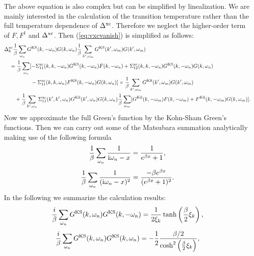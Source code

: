 %
The above equation is also complex but can be simplified by linealization.
We are mainly interested in the calculation of the transition temperature rather than the full temperature 
dependence of $\Delta^{\rm xc}$. Therefore we neglect the higher-order term of $F, F^{\dag}$ and $\Delta^{\rm xc}$.
Then (\ref{eq:vxcvanish}) is simplified as follows:
%
\begin{equation}
	\begin{split}
		&\Delta^{\rm xc}_{k}\frac{1}{\beta}\sum_{\omega_n}G^{\rm KS}(k,-\omega_n)G(k,\omega_n)
		\frac{1}{\beta}\sum_{k',\omega_m}G^{\rm KS}(k',\omega_m)G(k',\omega_m) \\
		& \quad =
		\frac{1}{\beta}\sum_{\omega_n} [-\Sigma^{\rm xc}_{11}(k,k,-\omega_n)G^{\rm KS}(k,-\omega_n)F(k,-\omega_n)
		+\Sigma^{\rm xc}_{12}(k,k,-\omega_n)G^{\rm KS}(k,-\omega_n)G(k,\omega_n) \\
		&\quad \quad \quad \quad \quad - \Sigma^{\rm xc}_{11}(k,k,\omega_n)F^{\rm KS}(k,-\omega_n)G(k,\omega_n)]
		\times \frac{1}{\beta}\sum_{k',\omega_m} G^{\rm KS}(k',\omega_m)G(k', \omega_m) \\
		& \quad \quad +
		\frac{1}{\beta}\sum_{k',\omega_n}\Sigma^{\rm xc}_{11}(k',k',\omega_n)G^{\rm KS}(k',\omega_n)
		G(k,\omega_n)\frac{1}{\beta}\sum_{\omega_m}
		[G^{\rm KS}(k,-\omega_m)F(k,-\omega_m) + F^{\rm KS}(k,-\omega_m)G(k,\omega_m)].
	\end{split}
	\label{eq:Deltaxceq}
\end{equation}
%
Now we approximate the full Green's function by the Kohn-Sham Green's functions.
Then we can carry out some of the Matsubara summation analytically making use of the following formula
%
\begin{equation}
	\frac{1}{\beta} \sum_{\omega_n} \frac{1}{ {\rm i}\omega_n - x} = 
	\frac{1}{e^{\beta x}+1},
	\label{eq:sumform1}
\end{equation}
%
\begin{equation}
	\frac{1}{\beta} \sum_{\omega_n} \frac{1}{ ({\rm i}\omega_n - x)^2} = 
	\frac{-\beta e^{\beta x}}{(e^{\beta x}+1)^2}.
	\label{eq:sumform2}
\end{equation}
%
In the following we summarize the calculation results: 
%
\begin{equation}
	\frac{i}{\beta}\sum_{\omega_n}
	G^{\rm KS}(k,\omega_n)G^{\rm KS}(k,-\omega_n) 
	= \frac{1}{2\xi_{k}}\tanh\left( \frac{\beta}{2}\xi_{k} \right),
	\label{eq:GGsum1}
\end{equation}
%
\begin{equation}
	\frac{i}{\beta}\sum_{\omega_n}
	G^{\rm KS}(k,\omega_n)G^{\rm KS}(k,\omega_n) 
	= - \frac{1}{2} \frac{\beta/2}{\cosh^2\left( \frac{\beta}{2}\xi_{k} \right)},
	\label{eq:GGsum2}
\end{equation}
